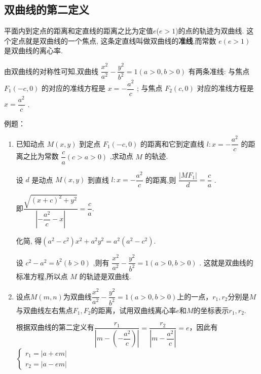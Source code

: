 \subsection*{双曲线的第二定义}
平面内到定点的距离和定直线的距离之比为定值$e$($e > 1$)的点的轨迹为双曲线. 这个定点就是双曲线的一个焦点, 这条定直线叫做双曲线的\textbf{准线},而常数 $e\left( {e > 1}\right)$ 是双曲线的离心率.
        
由双曲线的对称性可知,双曲线 $\dfrac{{x}^{2}}{{a}^{2}} - \dfrac{{y}^{2}}{{b}^{2}} = 1\left( {a > 0, b > 0}\right)$ 有两条准线: 与焦点 ${F}_{1}\left( {-c,0}\right)$ 的对应的准线方程是 $x =  - \dfrac{{a}^{2}}{c}$ ; 与焦点 ${F}_{2}\left( {c,0}\right)$ 对应的准线方程是 $x = \dfrac{{a}^{2}}{c}$ .

例题：
\begin{enumerate}
    \item 已知动点 $M\left( {x,y}\right)$ 到定点 ${F}_{1}\left( {-c,0}\right)$ 的距离和它到定直线 $l : x =  - \dfrac{{a}^{2}}{c}$ 的距离之比为常数 $\dfrac{c}{a}\left( {c > a > 0}\right)$ ,求动点 $M$ 的轨迹.

    \begin{jieda}
        设 $d$ 是动点 $M\left( {x,y}\right)$ 到直线 $l : x =  - \dfrac{{a}^{2}}{c}$ 的距离,则 $\dfrac{\left| M{F}_{1}\right| }{d} = \dfrac{c}{a}$ .
        
        即$\dfrac{\sqrt{{\left( x + c\right) }^{2} + {y}^{2}}}{\left| -\dfrac{{a}^{2}}{c} - x\right| } = \dfrac{c}{a}.$
        
        化简, 得$\left( {{a}^{2} - {c}^{2}}\right) {x}^{2} + {a}^{2}{y}^{2} = {a}^{2}\left( {{a}^{2} - {c}^{2}}\right) .$
        
        设 ${c}^{2} - {a}^{2} = {b}^{2}\left( {b > 0}\right)$ ,则有 $\dfrac{{x}^{2}}{{a}^{2}} - \dfrac{{y}^{2}}{{b}^{2}} = 1\left( {a > 0,b > 0}\right)$ . 这就是双曲线的标准方程,所以点 $M$ 的轨迹是双曲线.
    \end{jieda}
    \item 设点$M(m, n)$为双曲线$\dfrac{x^2}{a^2}-\dfrac{y^2}{b^2} = 1(a>0,b>0)$上的一点，$r_1, r_2$分别是$M$与双曲线左右焦点$F_1, F_2$的距离，试用双曲线离心率$e$和$M$的坐标表示$r_1, r_2$.
    \begin{jieda}
        根据双曲线的第二定义有$\dfrac{r_1}{\left|m - \left(-\dfrac{a^2}{c}\right)\right|} = \dfrac{r_2}{\left|m - \dfrac{a^2}{c}\right|} = e$，因此有$\left\{\begin{array}{l}
             r_1 = |a+em| \\
             r_2 = |a-em|
        \end{array}\right.$
        

\end{jieda}
\end{enumerate}

